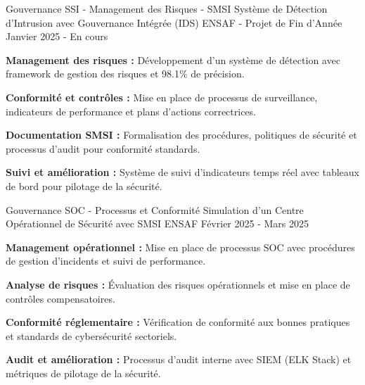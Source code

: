 
\begin{cventries}

    \cventry
    {Gouvernance SSI - Management des Risques - SMSI}
    {Système de Détection d'Intrusion avec Gouvernance Intégrée (IDS)} %
    {ENSAF - Projet de Fin d'Année} %
    {Janvier 2025 - En cours} %
    {
        \begin{cvitems} %
            \item {
                        \textbf{Management des risques :}
                        Développement d'un système de détection avec framework de gestion des risques et 98.1\% de précision.}
            \item {
                        \textbf{Conformité et contrôles :}
                        Mise en place de processus de surveillance, indicateurs de performance et plans d'actions correctrices.}
            \item {
                        \textbf{Documentation SMSI :}
                        Formalisation des procédures, politiques de sécurité et processus d'audit pour conformité standards.}
            \item {
                        \textbf{Suivi et amélioration :}
                        Système de suivi d'indicateurs temps réel avec tableaux de bord pour pilotage de la sécurité.}
        \end{cvitems}
    }

    \cventry
    {Gouvernance SOC - Processus et Conformité}
    {Simulation d'un Centre Opérationnel de Sécurité avec SMSI} %
    {ENSAF} %
    {Février 2025 - Mars 2025} %
    {
        \begin{cvitems} %
            \item {
                        \textbf{Management opérationnel :}
                        Mise en place de processus SOC avec procédures de gestion d'incidents et suivi de performance.}
            \item {
                        \textbf{Analyse de risques :}
                        Évaluation des risques opérationnels et mise en place de contrôles compensatoires.}
            \item {
                        \textbf{Conformité réglementaire :}
                        Vérification de conformité aux bonnes pratiques et standards de cybersécurité sectoriels.}
            \item {
                        \textbf{Audit et amélioration :}
                        Processus d'audit interne avec SIEM (ELK Stack) et métriques de pilotage de la sécurité.}
        \end{cvitems}
    }

\end{cventries}